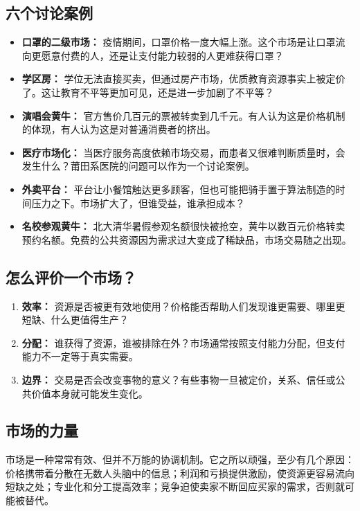 \documentclass[10pt,a4paper]{ctexart}
\begin{document}
\subsection{六个讨论案例}

\begin{itemize}
  \item \textbf{口罩的二级市场：} 疫情期间，口罩价格一度大幅上涨。这个市场是让口罩流向更愿意付费的人，还是让支付能力较弱的人更难获得口罩？
  \item \textbf{学区房：} 学位无法直接买卖，但通过房产市场，优质教育资源事实上被定价了。这让教育不平等更加可见，还是进一步加剧了不平等？
  \item \textbf{演唱会黄牛：} 官方售价几百元的票被转卖到几千元。有人认为这是价格机制的体现，有人认为这是对普通消费者的挤出。
  \item \textbf{医疗市场化：} 当医疗服务高度依赖市场交易，而患者又很难判断质量时，会发生什么？莆田系医院的问题可以作为一个讨论案例。
  \item \textbf{外卖平台：} 平台让小餐馆触达更多顾客，但也可能把骑手置于算法制造的时间压力之下。市场扩大了，但谁受益，谁承担成本？
  \item \textbf{名校参观黄牛：} 北大清华暑假参观名额很快被抢空，黄牛以数百元价格转卖预约名额。免费的公共资源因为需求过大变成了稀缺品，市场交易随之出现。
\end{itemize}

\subsection{怎么评价一个市场？}

\begin{enumerate}
  \item \textbf{效率：} 资源是否被更有效地使用？价格能否帮助人们发现谁更需要、哪里更短缺、什么更值得生产？
  \item \textbf{分配：} 谁获得了资源，谁被排除在外？市场通常按照支付能力分配，但支付能力不一定等于真实需要。
  \item \textbf{边界：} 交易是否会改变事物的意义？有些事物一旦被定价，关系、信任或公共价值本身就可能发生变化。
\end{enumerate}

\subsection{市场的力量}

市场是一种常常有效、但并不万能的协调机制。它之所以顽强，至少有几个原因：价格携带着分散在无数人头脑中的信息；利润和亏损提供激励，使资源更容易流向短缺之处；专业化和分工提高效率；竞争迫使卖家不断回应买家的需求，否则就可能被替代。
\end{document}
